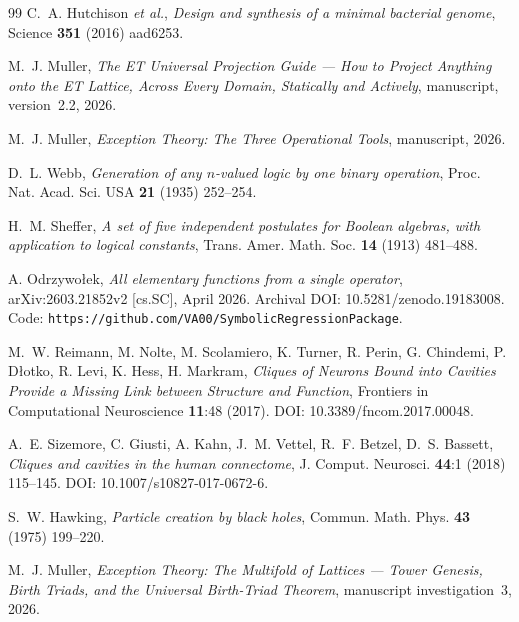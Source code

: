 \documentclass[11pt,a4paper]{article}
\theoremstyle{definition}
\theoremstyle{remark}
\begin{document}
\begin{thebibliography}{99}
C.~A. Hutchison \emph{et al.},
\emph{Design and synthesis of a minimal bacterial genome},
Science {\bf 351} (2016) aad6253.

M.~J. Muller,
\emph{The ET Universal Projection Guide --- How to Project Anything onto the ET Lattice, Across Every Domain, Statically and Actively}, manuscript, version~2.2, 2026.

M.~J. Muller,
\emph{Exception Theory: The Three Operational Tools}, manuscript, 2026.

D.~L. Webb,
\emph{Generation of any $n$-valued logic by one binary operation},
Proc. Nat. Acad. Sci. USA {\bf 21} (1935) 252--254.

H.~M. Sheffer,
\emph{A set of five independent postulates for Boolean algebras, with application to logical constants},
Trans. Amer. Math. Soc. {\bf 14} (1913) 481--488.

A. Odrzywo{\l}ek,
\emph{All elementary functions from a single operator},
arXiv:2603.21852v2 [cs.SC], April 2026.
Archival DOI: 10.5281/zenodo.19183008.
Code: \texttt{https://github.com/VA00/SymbolicRegressionPackage}.

M.~W. Reimann, M. Nolte, M. Scolamiero, K. Turner, R. Perin, G. Chindemi, P. D{\l}otko, R. Levi, K. Hess, H. Markram,
\emph{Cliques of Neurons Bound into Cavities Provide a Missing Link between Structure and Function},
Frontiers in Computational Neuroscience {\bf 11}:48 (2017).
DOI: 10.3389/fncom.2017.00048.

A.~E. Sizemore, C. Giusti, A. Kahn, J.~M. Vettel, R.~F. Betzel, D.~S. Bassett,
\emph{Cliques and cavities in the human connectome},
J. Comput. Neurosci. {\bf 44}:1 (2018) 115--145.
DOI: 10.1007/s10827-017-0672-6.

S.~W. Hawking,
\emph{Particle creation by black holes},
Commun. Math. Phys. {\bf 43} (1975) 199--220.

M.~J. Muller,
\emph{Exception Theory: The Multifold of Lattices --- Tower Genesis, Birth Triads, and the Universal Birth-Triad Theorem}, manuscript investigation~3, 2026.

\end{thebibliography}
\end{document}
